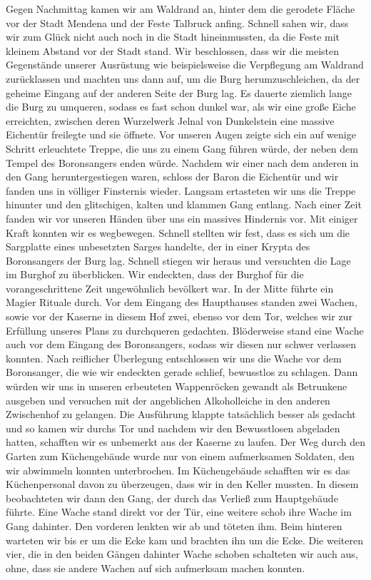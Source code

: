 Gegen Nachmittag kamen wir am Waldrand an, hinter dem die gerodete Fläche vor der Stadt Mendena und der Feste Talbruck anfing. Schnell sahen wir, dass wir zum Glück nicht auch noch in die Stadt hineinmussten, da die Feste mit kleinem Abstand vor der Stadt stand. Wir beschlossen, dass wir die meisten Gegenstände unserer Ausrüstung wie beispielsweise die Verpflegung am Waldrand zurücklassen und machten uns dann auf, um die Burg herumzuschleichen, da der geheime Eingang auf der anderen Seite der Burg lag. Es dauerte ziemlich lange die Burg zu umqueren, sodass es fast schon dunkel war, als wir eine große Eiche erreichten, zwischen deren Wurzelwerk Jelnal von Dunkelstein eine massive Eichentür freilegte und sie öffnete. Vor unseren Augen zeigte sich ein auf wenige Schritt erleuchtete Treppe, die uns zu einem Gang führen würde, der neben dem Tempel des Boronsangers enden würde. Nachdem wir einer nach dem anderen in den Gang heruntergestiegen waren, schloss der Baron die Eichentür und wir fanden uns in völliger Finsternis wieder. Langsam ertasteten wir uns die Treppe hinunter und den glitschigen, kalten und klammen Gang entlang. Nach einer Zeit fanden wir vor unseren Händen über uns ein massives Hindernis vor. Mit einiger Kraft konnten wir es wegbewegen. Schnell stellten wir fest, dass es sich um die Sargplatte eines unbesetzten Sarges handelte, der in einer Krypta des Boronsangers der Burg lag. Schnell stiegen wir heraus und versuchten die Lage im Burghof zu überblicken. Wir endeckten, dass der Burghof für die vorangeschrittene Zeit ungewöhnlich bevölkert war. In der Mitte führte ein Magier Rituale durch. Vor dem Eingang des Haupthauses standen zwei Wachen, sowie vor der Kaserne in diesem Hof zwei, ebenso vor dem Tor, welches wir zur Erfüllung unseres Plans zu durchqueren gedachten. Blöderweise stand eine Wache auch vor dem Eingang des Boronsangers, sodass wir diesen nur schwer verlassen konnten. Nach reiflicher Überlegung entschlossen wir uns die Wache vor dem Boronsanger, die wie wir endeckten gerade schlief, bewusstlos zu schlagen. Dann würden wir uns in unseren erbeuteten Wappenröcken gewandt als Betrunkene ausgeben und versuchen mit der angeblichen Alkoholleiche in den anderen Zwischenhof zu gelangen. Die Ausführung klappte tatsächlich besser als gedacht und so kamen wir durchs Tor und nachdem wir den Bewusstlosen abgeladen hatten, schafften wir es unbemerkt aus der Kaserne zu laufen. Der Weg durch den Garten zum Küchengebäude wurde nur von einem aufmerksamen Soldaten, den wir abwimmeln konnten unterbrochen. Im Küchengebäude schafften wir es das Küchenpersonal davon zu überzeugen, dass wir in den Keller mussten. In diesem beobachteten wir dann den Gang, der durch das Verließ zum Hauptgebäude führte. Eine Wache stand direkt vor der Tür, eine weitere schob ihre Wache im Gang dahinter. Den vorderen lenkten wir ab und töteten ihm. Beim hinteren warteten wir bis er um die Ecke kam und brachten ihn um die Ecke. Die weiteren vier, die in den beiden Gängen dahinter Wache schoben schalteten wir auch aus, ohne, dass sie andere Wachen auf sich aufmerksam machen konnten.


